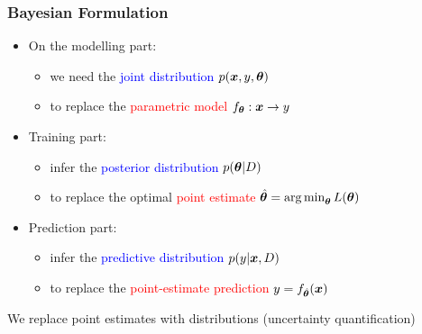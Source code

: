 \begin{frame}
  \frametitle{Bayesian Formulation}
  \begin{itemize}
    \item On the modelling part:
      \begin{itemize}
        \item we need the \textcolor{blue}{joint distribution \(p(\boldsymbol{x},y,\boldsymbol{\theta})\)}
        \item to replace the \textcolor{red}{parametric model \(f_{\boldsymbol{\theta}}: \boldsymbol{x} \rightarrow y\)}
      \end{itemize}

    \item Training part:
      \begin{itemize}
        \item infer the \textcolor{blue}{posterior distribution \(p(\boldsymbol{\theta}|D)\)}
        \item to replace the optimal \textcolor{red}{point estimate \(\hat{\boldsymbol{\theta}} = \operatorname*{arg\,min}_{\boldsymbol{\theta}} L(\boldsymbol{\theta})\)}
      \end{itemize}

    \item Prediction part:
      \begin{itemize}
        \item infer the \textcolor{blue}{predictive distribution \(p(y|\boldsymbol{x},D)\)}
        \item to replace the \textcolor{red}{point-estimate prediction \(y=f_{\hat{\boldsymbol{\theta}}}(\boldsymbol{x})\)}
      \end{itemize}
    \end{itemize}
    \noindent\makebox[\linewidth]{\rule{\paperwidth}{0.4pt}}
    We replace point estimates \alert{with distributions (uncertainty quantification)}

\end{frame}

